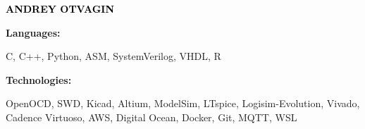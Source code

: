 \documentclass[9pt]{developercv} %
\begin{document}

\begin{minipage}[t]{0.5\textwidth}
	\vspace{-\baselineskip} %

	{ \fontsize{16}{20} \textcolor{black}{\textbf{\MakeUppercase{Andrey Otvagin}}}} %

	\vspace{6pt}
    \hspace{12pt}

    \hspace{12pt}

    \hspace{12pt}


\end{minipage}
\hfill
\begin{minipage}[t]{0.5\textwidth}
    \vspace{-18pt}
    \vspace{-6pt}

    \begin{minipage}[t]{0.2\textwidth}
        \textbf{Languages:}
    \end{minipage}
    \hfill
    \begin{minipage}[t]{0.73\textwidth}
        C, C++, Python, ASM, SystemVerilog, VHDL, R
    \end{minipage}
    \vspace{4mm}

    \begin{minipage}[t]{0.2\textwidth}
        \textbf{Technologies:}
    \end{minipage}
    \hfill
    \begin{minipage}[t]{0.73\textwidth}
        OpenOCD, SWD, Kicad, Altium, ModelSim, LTspice, Logisim-Evolution, Vivado, Cadence Virtuoso, AWS, Digital Ocean, Docker, Git, MQTT, WSL
    \end{minipage}

\end{minipage}
\end{document}
